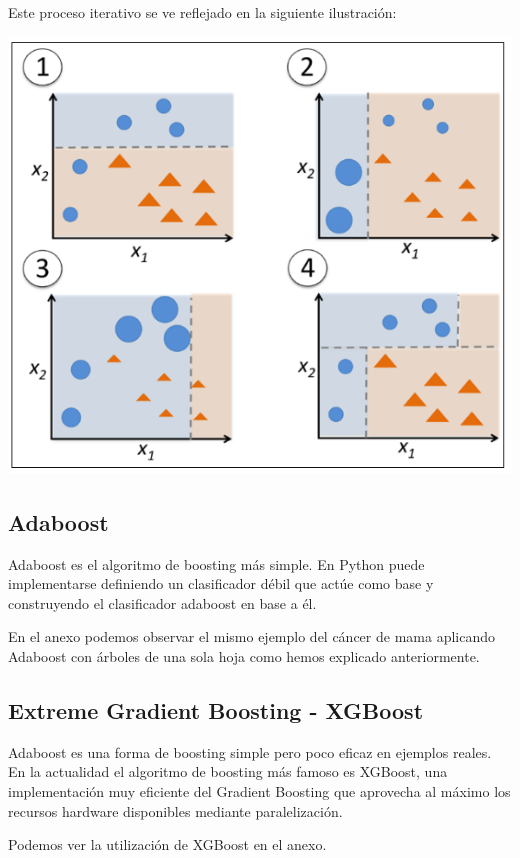 Este proceso iterativo se ve reflejado en la siguiente ilustración:
\begin{center}
\includegraphics[scale=0.7]{./img/adaboost.png}
\end{center}

\subsection{Adaboost}

Adaboost es el algoritmo de boosting más simple.  
En Python puede implementarse definiendo un clasificador débil que actúe como base y construyendo el clasificador adaboost en base a él.  

En el anexo podemos observar el mismo ejemplo del cáncer de mama aplicando Adaboost con árboles de una sola hoja como hemos explicado anteriormente.

\subsection{Extreme Gradient Boosting - XGBoost}
Adaboost es una forma de boosting simple pero poco eficaz en ejemplos reales.  
En la actualidad el algoritmo de boosting más famoso es XGBoost, una implementación muy eficiente del Gradient Boosting que aprovecha al máximo los recursos hardware disponibles mediante paralelización.  

Podemos ver la utilización de XGBoost en el anexo.

